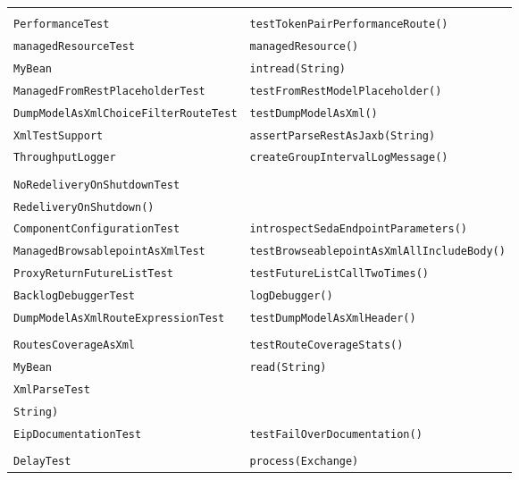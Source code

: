 \begin{center}
\begin{longtable}{ll}
\raisebox{-13pt}{\shortstack{\lstinline/TokenPairIteratorSplitChoice/-\\\lstinline/PerformanceTest/}}&{\lstinline/testTokenPairPerformanceRoute()/}\\
\lstinline/managedResourceTest/&{\lstinline/managedResource()/}\\
\lstinline/MyBean/&{\lstinline/intread(String)/}\\
\lstinline/ManagedFromRestPlaceholderTest/&{\lstinline/testFromRestModelPlaceholder()/}\\
\lstinline/DumpModelAsXmlChoiceFilterRouteTest/&{\lstinline/testDumpModelAsXml()/}\\
\lstinline/XmlTestSupport/&{\lstinline/assertParseRestAsJaxb(String)/}\\
\lstinline/ThroughputLogger/&{\lstinline/createGroupIntervalLogMessage()/}\\
\raisebox{-13pt}{\shortstack{\lstinline/RedeliveryDeadLetterErrorHandler/-\\\lstinline/NoRedeliveryOnShutdownTest/}}&\raisebox{-13pt}{\shortstack{\lstinline/testRedeliveryErrorHandlerNo/-\\\lstinline/RedeliveryOnShutdown()/}}\\
\lstinline/ComponentConfigurationTest/&{\lstinline/introspectSedaEndpointParameters()/}\\
\lstinline/ManagedBrowsablepointAsXmlTest/&{\lstinline/testBrowseablepointAsXmlAllIncludeBody()/}\\
\lstinline/ProxyReturnFutureListTest/&{\lstinline/testFutureListCallTwoTimes()/}\\
\lstinline/BacklogDebuggerTest/&{\lstinline/logDebugger()/}\\
\lstinline/DumpModelAsXmlRouteExpressionTest/&{\lstinline/testDumpModelAsXmlHeader()/}\\
\raisebox{-13pt}{\shortstack{\lstinline/ManagedCamelContextDump/-\\\lstinline/RoutesCoverageAsXml/}}&{\lstinline/testRouteCoverageStats()/}\\
\lstinline/MyBean/&{\lstinline/read(String)/}\\
\lstinline/XmlParseTest/&\raisebox{-13pt}{\shortstack{\lstinline/assertChildTo(String, ProcessorDefinition,/\\\lstinline/String)/}}\\
\lstinline/EipDocumentationTest/&{\lstinline/testFailOverDocumentation()/}\\
\raisebox{-13pt}{\shortstack{\lstinline/RedeliveryErrorHandlerNonBlocked/-\\\lstinline/DelayTest/}}&{\lstinline/process(Exchange)/}\\

\end{longtable}
\end{center}
